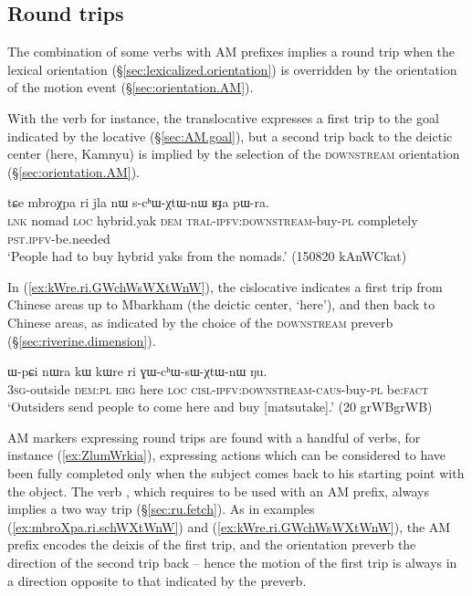 \subsection{Round trips} \label{sec:round.trip.AM}
The combination of some verbs with AM prefixes implies a round trip when the lexical orientation (§\ref{sec:lexicalized.orientation}) is overridden by the orientation of the motion event (§\ref{sec:orientation.AM}). 

With the verb  for instance, the translocative expresses a first trip to the goal indicated by the locative  (§\ref{sec:AM.goal}), but a second trip back to the deictic center (here, Kamnyu) is implied by the selection of the \textsc{downstream} orientation (§\ref{sec:orientation.AM}).  

 \begin{exe}
\ex \label{ex:mbroXpa.ri.schWXtWnW}
\gll tɕe mbroχpa ri jla nɯ s-cʰɯ-χtɯ-nɯ ʁɟa pɯ-ra. \\
\textsc{lnk} nomad \textsc{loc} hybrid.yak \textsc{dem}  \textsc{tral}-\textsc{ipfv}:\textsc{downstream}-buy-\textsc{pl} completely \textsc{pst}.\textsc{ipfv}-be.needed \\
\glt `People had to buy hybrid yaks from the nomads.' (150820 kAnWCkat)
\end{exe}

In (\ref{ex:kWre.ri.GWchWsWXtWnW}), the cislocative indicates a first trip from Chinese areas up to Mbarkham (the deictic center,  `here'), and then back to Chinese areas, as indicated by the choice of the \textsc{downstream} preverb (§\ref{sec:riverine.dimension}).

\begin{exe}
\ex \label{ex:kWre.ri.GWchWsWXtWnW}
\gll   ɯ-pɕi nɯra kɯ kɯre ri ɣɯ-cʰɯ-sɯ-χtɯ-nɯ ŋu.  \\
  \textsc{3sg}-outside  \textsc{dem}:\textsc{pl}  \textsc{erg} here \textsc{loc} \textsc{cisl}-\textsc{ipfv}:\textsc{downstream}-\textsc{caus}-buy-\textsc{pl} be:\textsc{fact} \\ 
\glt `Outsiders send people to come here and buy [matsutake].' (20 grWBgrWB)  
  \end{exe} 

AM markers expressing round trips are found with a handful of verbs, for instance  (\ref{ex:ZlumWrkia}), expressing actions which can be considered to have been fully completed only when the subject comes back to his starting point with the object.  The verb , which requires to be used with an AM prefix, always implies a two way trip (§\ref{sec:ru.fetch}). As in examples (\ref{ex:mbroXpa.ri.schWXtWnW}) and (\ref{ex:kWre.ri.GWchWsWXtWnW}), the AM prefix encodes the deixis of the first trip, and the orientation preverb the direction of the second trip back -- hence the motion of the first trip is always in a direction opposite to that indicated by the preverb.
 

